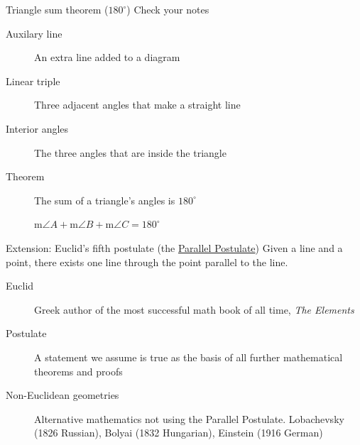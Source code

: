 \begin{frame}{Triangle sum theorem ($180^\circ$)}
  {Check your notes}
     \smallskip
  \begin{description}
    \item[Auxilary line] An extra line added to a diagram
    \item[Linear triple] Three adjacent angles that make a straight line
    \item[Interior angles] The three angles that are inside the triangle
    \item[Theorem] The sum of a triangle's angles is $180^\circ$ \par \smallskip
    m$\angle A + \text{m}\angle B + \text{m}\angle C = 180^\circ$
  \end{description}
  \end{frame}

\begin{frame}{Extension: Euclid's fifth postulate (the \href{https://mathworld.wolfram.com/ParallelPostulate.html}{Parallel Postulate})}
  {Given a line and a point, there exists one line through the point parallel to the line.}
     \smallskip
  \begin{description}
    \item[Euclid] Greek author of the most successful math book of all time, \emph{The Elements}
    \item[Postulate] A statement we assume is true as the basis of all further mathematical theorems and proofs
    \item[Non-Euclidean geometries] Alternative mathematics not using the Parallel Postulate. Lobachevsky (1826 Russian), Bolyai (1832 Hungarian), Einstein (1916 German)
  \end{description}
  \end{frame}

